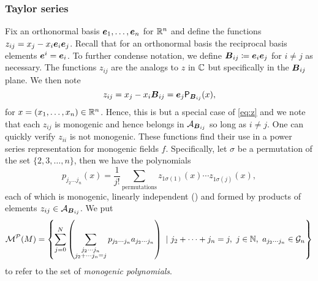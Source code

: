 \subsubsection{Taylor series}
Fix an orthonormal basis $\boldsymbol{e}_1,\dots,\boldsymbol{e}_n$ for $\mathbb{R}^n$ and define the functions $z_{ij} = x_j - x_i \boldsymbol{e}_i \boldsymbol{e}_j$. Recall that for an orthonormal basis the reciprocal basis elements $\boldsymbol{e}^i=\boldsymbol{e}_i$. To further condense notation, we define $\boldsymbol{B}_{ij}\coloneqq \boldsymbol{e}_i \boldsymbol{e}_j$ for $i\neq j$ as necessary. The functions $z_{ij}$ are the analogs to $z$ in $\mathbb{C}$ but specifically in the $\boldsymbol{B}_{ij}$ plane. We then note
\begin{equation}
z_{ij} = x_j - x_i \boldsymbol{B}_{ij} = \boldsymbol{e}_j\mathsf{P}_{\boldsymbol{B}_{ij}}(x),
\end{equation}
for $x=(x_1,\dots,x_n)\in \mathbb{R}^n$. Hence, this is but a special case of \cref{eq:z} and we note that each $z_{ij}$ is monogenic and hence belongs in $\mathcal{A}_{\boldsymbol{B}_{ij}}$ so long as $i \neq j$. One can quickly verify $z_{ii}$ is not monogenic. These functions find their use in a power series representation for monogenic fields $f$. Specifically, let $\sigma$ be a permutation of the set $\{2,3,\dots,n\}$, then we have the polynomials
\begin{equation}
        p_{j_2 \dots j_n}(x) = \frac{1}{j!} \sum_{\textrm{permutations}}z_{1\sigma(1)}(x) \cdots z_{1\sigma(j)}(x),
\end{equation}
each of which is monogenic, linearly independent (\cite[Proposition 1]{ryan_clifford_2004}) and formed by products of elements $z_{ij} \in \mathcal{A}_{\boldsymbol{B}_{ij}}$. We put
\begin{equation}
    \mathcal{M}^\mathcal{P}(M) = \left\{\sum_{j=0}^N \left(\sum_{\substack{{j_2 \cdots j_n} \\ {j_2 + \cdots j_n = j}}}p_{j_2 \cdots j_n}a_{j_2 \cdots j_n}\right) ~\vert~ j_2+\cdots+j_n = j,~ j\in \mathbb{N}, ~ a_{j_2\cdots j_n} \in \mathcal{G}_n\right\}
\end{equation}
to refer to the set of \emph{monogenic polynomials}. 

